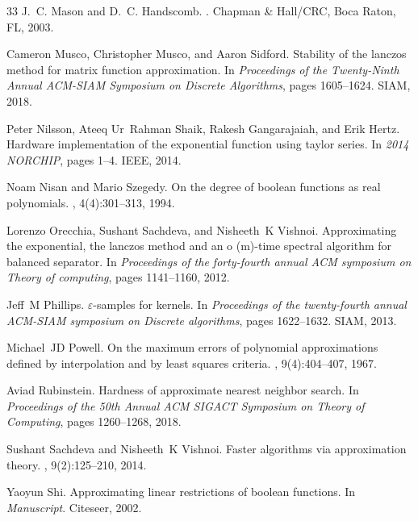 \begin{thebibliography}{33}
J.~C. Mason and D.~C. Handscomb.
.
\newblock Chapman \& Hall/CRC, Boca Raton, FL, 2003.

Cameron Musco, Christopher Musco, and Aaron Sidford.
\newblock Stability of the lanczos method for matrix function approximation.
\newblock In {\em Proceedings of the Twenty-Ninth Annual ACM-SIAM Symposium on
  Discrete Algorithms}, pages 1605--1624. SIAM, 2018.

Peter Nilsson, Ateeq Ur~Rahman Shaik, Rakesh Gangarajaiah, and Erik Hertz.
\newblock Hardware implementation of the exponential function using taylor
  series.
\newblock In {\em 2014 NORCHIP}, pages 1--4. IEEE, 2014.

Noam Nisan and Mario Szegedy.
\newblock On the degree of boolean functions as real polynomials.
, 4(4):301--313, 1994.

Lorenzo Orecchia, Sushant Sachdeva, and Nisheeth~K Vishnoi.
\newblock Approximating the exponential, the lanczos method and an o (m)-time
  spectral algorithm for balanced separator.
\newblock In {\em Proceedings of the forty-fourth annual ACM symposium on
  Theory of computing}, pages 1141--1160, 2012.

Jeff~M Phillips.
\newblock $\varepsilon$-samples for kernels.
\newblock In {\em Proceedings of the twenty-fourth annual ACM-SIAM symposium on
  Discrete algorithms}, pages 1622--1632. SIAM, 2013.

Michael~JD Powell.
\newblock On the maximum errors of polynomial approximations defined by
  interpolation and by least squares criteria.
, 9(4):404--407, 1967.

Aviad Rubinstein.
\newblock Hardness of approximate nearest neighbor search.
\newblock In {\em Proceedings of the 50th Annual ACM SIGACT Symposium on Theory
  of Computing}, pages 1260--1268, 2018.

Sushant Sachdeva and Nisheeth~K Vishnoi.
\newblock Faster algorithms via approximation theory.
, 9(2):125--210, 2014.

Yaoyun Shi.
\newblock Approximating linear restrictions of boolean functions.
\newblock In {\em Manuscript}. Citeseer, 2002.


\end{thebibliography}
